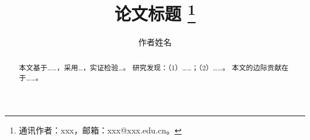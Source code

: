 \documentclass{chinese-erj}
\title{论文标题%
    \thanks{通讯作者：xxx，邮箱：xxx@xxx.edu.cn。}}
\author{作者姓名}
\begin{document}
\maketitle

\begin{abstract}
本文基于\ldots\ldots，采用\ldots{}，实证检验\ldots{}。
研究发现：（1）\ldots\ldots；（2）\ldots\ldots。
本文的边际贡献在于\ldots\ldots。

\end{abstract}







\erjref
\printbibliography[heading=none]

\enmaketitle
\end{document}
